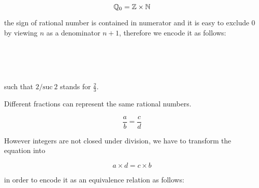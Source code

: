 $$\mathbb{Q}_0 = \mathbb{Z} \times \mathbb{N}$$

the sign of rational number is contained in numerator and it is easy to exclude $0$ by viewing $n$ as a denominator $n + 1$, therefore we encode it as follows:

\begin{code}\>\<%
\\
\>  \AgdaSymbol{:}  \<%
\\
\>[0]\<[2]%
\>[2] \AgdaSymbol{:} \AgdaSymbol{(} \AgdaSymbol{:} \AgdaSymbol{)}  \AgdaSymbol{(} \AgdaSymbol{:} \AgdaSymbol{)}  \<%
\\
\>\<\end{code}

such that $2 /\text{suc}~ 2$ stands for $\frac{2}{3}$.




Different fractions can represent the same rational numbers.

$$ \frac{a}{b} = \frac{c}{d} $$

However integers are not closed under division, we have to transform the equation into

$$a \times d = c \times b $$

in order to encode it as an equivalence relation as follows:

\begin{code}\>\<%
\\
\> \<[6]%
\>[6]\AgdaSymbol{:}     \<%
\\
\>       \AgdaSymbol{=} \<[27]%
\>[27]  \AgdaSymbol{(}\AgdaInductiveConstructor{+}  \AgdaSymbol{)}    \AgdaSymbol{(}\AgdaInductiveConstructor{+}  \AgdaSymbol{)}\<%
\\
\>\<\end{code}


